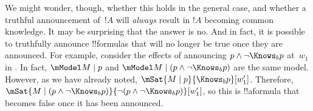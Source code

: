 \documentclass[../../../include/open-logic-section]{subfiles}
\begin{document}
We might wonder, though, whether this holds in the general case, and
whether a truthful announcement of~$!A$ will \emph{always} result in
$!A$ becoming common knowledge. It may be surprising that the answer
is no. And in fact, it is possible to truthfully announce !!{formula}s
that will no longer be true once they are announced. For example,
consider the effects of announcing $p \land \lnot \Knows_b p$ at~$w_1$
in . In fact, $\mModel M \mid p$ and
$\mModel M \mid (p \land \lnot \Knows_b p)$ are the same model.
However, as we have already noted, $\mSat{M \mid p}{\Knows_b
p}[w'_1]$. Therefore, $\mSat{M \mid (p \land \lnot \Knows_b p)}{\lnot
(p \land \lnot \Knows_b p)}[w'_1]$, so this is !!a{formula} that
becomes false once it has been announced. 
\end{document}
